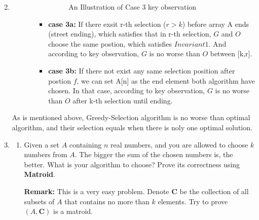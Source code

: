 \documentclass[12pt,a4paper]{article}
\makeatletter
\newtheorem*{solution}{Solution}
\theoremstyle{definition}
\renewenvironment{solution}[1][Solution] {\par\pushQED{\qed}\normalfont\topsep6\p@\@plus6\p@\relax\trivlist\item[\hskip\labelsep\bfseries#1\@addpunct{.}]\ignorespaces}{\popQED\endtrivlist\@endpefalse} \makeatother
\makeatother
\begin{document}
\begin{enumerate}
\begin{solution}
\begin{itemize}
\begin{itemize}
\begin{itemize}
\begin{figure}[htbp]
                    \caption{An Illustration of Case 3 key observation}\label{1_2}
                \end{figure}
    			\item  \textbf{case 3a:} If there exsit r-th selection ($r>k$) before array A ends (street ending), which satisfies that in r-th selection, $G$ and $O$ choose the same postion, which satisfies $Invariant 1$. And according to key observation, $G$ is no worse than $O$ between [k,r].
    			\item  \textbf{case 3b:} If there not exist any same selection position after postion $f$, we can set A[n] as the end element both algorithm have chosen. In that case, according to key observation, $G$ is no worse than $O$ after k-th selection until ending.
    		\end{itemize}
    	\end{itemize}
    \end{itemize}
    As is mentioned above, Greedy-Selection algorithm is no worse than optimal algorithm, and their selection equals when there is noly one optimal solution.
    \end{solution}

    \item
\begin{enumerate}
\item
    Given a set $A$ containing $n$ real numbers, and you are allowed to choose $k$ numbers from $A$. The bigger the sum of the chosen numbers is, the better. What is your algorithm to choose? Prove its correctness using \textbf{Matroid}.\par
\textbf{Remark:} This is a very easy problem. Denote $\mathbf{C}$ be the collection of all subsets of $A$ that contains no more than $k$ elements. Try to prove $(A,\mathbf{C})$ is a matroid.\par
\end{enumerate}
\end{enumerate}
\end{document}
